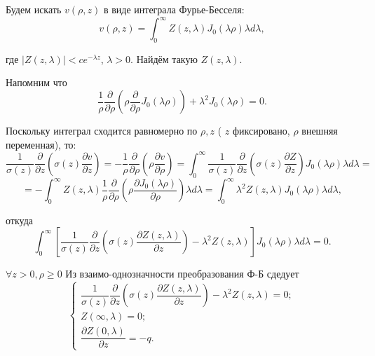 \documentclass{article}
\begin{document}
Будем искать $v(\rho,z)$ в виде интеграла Фурье-Бесселя:
\begin{equation}
	v(\rho,z) = \int_0^{\infty} Z(z,\lambda) J_0(\lambda\rho) \lambda d \lambda,
\end{equation}

где $|Z(z,\lambda)| < c e^{-\lambda z}$, $\lambda > 0$.
Найдём такую $Z(z,\lambda)$.

Напомним что
\begin{equation*}
	\dfrac{1}{\rho} \dfrac{\partial}{\partial \rho} \left( \rho \dfrac{\partial}{\partial \rho} J_0(\lambda \rho) \right) + \lambda^2 J_0(\lambda \rho) = 0.
\end{equation*}

Поскольку интеграл сходится равномерно по $\rho, z$ ( $z$ фиксировано, $\rho$ внешняя переменная), то:
\begin{equation*}
	\dfrac{1}{\sigma(z)}\dfrac{\partial}{\partial z} \left( \sigma(z) \dfrac{\partial v}{\partial z} \right) =
	- \dfrac{1}{\rho} \dfrac{\partial}{\partial \rho} \left( \rho \dfrac{\partial v}{\partial \rho} \right) =
	\int_0^{\infty} \dfrac{1}{\sigma(z)}\dfrac{\partial}{\partial z} \left( \sigma(z) \dfrac{\partial Z}{\partial z} \right) J_0(\lambda \rho) \lambda d \lambda =
\end{equation*}
\begin{equation*}
	= - \int_0^{\infty} Z(z,\lambda) \dfrac{1}{\rho} \dfrac{\partial}{\partial \rho} \left( \rho \dfrac{\partial J_0(\lambda \rho)}{\partial \rho} \right) \lambda d \lambda = 
	\int_0^{\infty} \lambda^2 Z(z,\lambda) J_0(\lambda \rho) \lambda d \lambda,
\end{equation*}

откуда 
\begin{equation*}
	\int_0^{\infty} \left[ \dfrac{1}{\sigma(z)} \dfrac{\partial}{\partial z} \left( \sigma(z) \dfrac{\partial Z(z,\lambda)}{\partial z} \right) - \lambda^2 Z(z,\lambda) \right] J_0(\lambda \rho) \lambda d \lambda = 0.
\end{equation*}

$\forall z > 0, \rho \geqslant 0$ Из взаимо-однозначности преобразования Ф-Б сдедует
\begin{equation}
\begin{cases}
	\dfrac{1}{\sigma(z)} \dfrac{\partial}{\partial z} \left( \sigma(z) \dfrac{\partial Z(z,\lambda)}{\partial z} \right) - \lambda^2 Z(z,\lambda) = 0;\\
	Z(\infty, \lambda) = 0;\\
	\dfrac{\partial Z(0,\lambda)}{\partial z} = -q.
\end{cases}
\label{Z system}
\end{equation}
\end{document}
